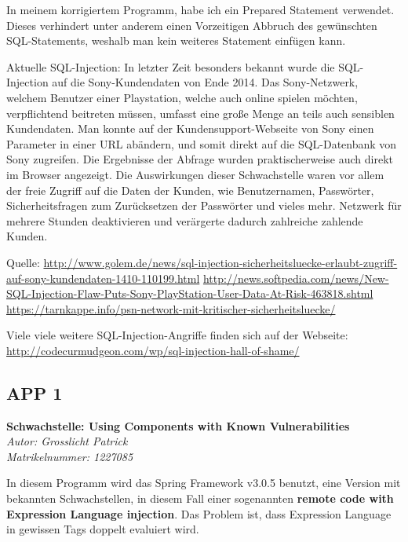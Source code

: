 \documentclass[12pt,a4paper,titlepage,oneside]{scrartcl}
\begin{document}
In meinem korrigiertem Programm, habe ich ein Prepared Statement verwendet. Dieses
verhindert unter anderem einen Vorzeitigen Abbruch des gewünschten SQL-Statements,
weshalb man kein weiteres Statement einfügen kann.

Aktuelle SQL-Injection:
In letzter Zeit besonders bekannt wurde die SQL-Injection auf die Sony-Kundendaten
von Ende 2014. Das Sony-Netzwerk, welchem Benutzer einer Playstation, welche auch online
spielen möchten, verpflichtend beitreten müssen, umfasst eine große Menge an teils
auch sensiblen Kundendaten.
Man konnte auf der Kundensupport-Webseite von Sony einen Parameter in einer URL abändern,
und somit direkt auf die SQL-Datenbank von Sony zugreifen. Die Ergebnisse der Abfrage
wurden praktischerweise auch direkt im Browser angezeigt.
Die Auswirkungen dieser Schwachstelle waren vor allem der freie Zugriff auf die Daten
der Kunden, wie Benutzernamen, Passwörter, Sicherheitsfragen zum Zurücksetzen der 
Passwörter und vieles mehr.
Netzwerk für mehrere Stunden deaktivieren und verärgerte dadurch zahlreiche zahlende Kunden.

Quelle: 
\url{http://www.golem.de/news/sql-injection-sicherheitsluecke-erlaubt-zugriff-auf-sony-kundendaten-1410-110199.html}
\url{http://news.softpedia.com/news/New-SQL-Injection-Flaw-Puts-Sony-PlayStation-User-Data-At-Risk-463818.shtml}
\url{https://tarnkappe.info/psn-network-mit-kritischer-sicherheitsluecke/}

Viele viele weitere SQL-Injection-Angriffe finden sich auf der Webseite:
\url{http://codecurmudgeon.com/wp/sql-injection-hall-of-shame/}

\subsection{APP 1}
\textbf{{\large Schwachstelle:} Using Components with Known Vulnerabilities}\\
\emph{Autor: Grosslicht Patrick\\Matrikelnummer: 1227085}

In diesem Programm wird das Spring Framework v3.0.5 benutzt, eine Version mit bekannten Schwachstellen, in diesem Fall einer sogenannten \textbf{remote code with Expression Language injection}. Das Problem ist, dass Expression Language in gewissen Tags doppelt evaluiert wird.
\end{document}
